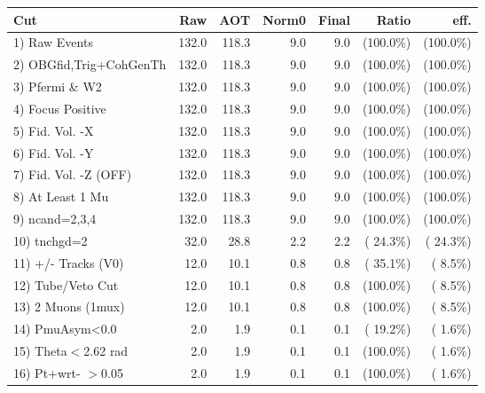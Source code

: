  \begin{table}[h!]\centering
 \begin{tabular}{||l||r|r|r|r|r|r||}
 \hline
 \hline
 Cut & Raw & AOT & Norm0 & Final & Ratio & eff.       \\
 \hline
  1) Raw Events           &        132.0 &        118.3 &          9.0 &          9.0 & (100.0\%) & (100.0\%) \\
  2) OBGfid,Trig+CohGenTh &        132.0 &        118.3 &          9.0 &          9.0 & (100.0\%) & (100.0\%) \\
  3) Pfermi \& W2         &        132.0 &        118.3 &          9.0 &          9.0 & (100.0\%) & (100.0\%) \\
  4) Focus Positive       &        132.0 &        118.3 &          9.0 &          9.0 & (100.0\%) & (100.0\%) \\
  5) Fid. Vol. -X         &        132.0 &        118.3 &          9.0 &          9.0 & (100.0\%) & (100.0\%) \\
  6) Fid. Vol. -Y         &        132.0 &        118.3 &          9.0 &          9.0 & (100.0\%) & (100.0\%) \\
  7) Fid. Vol. -Z (OFF)   &        132.0 &        118.3 &          9.0 &          9.0 & (100.0\%) & (100.0\%) \\
  8) At Least 1 Mu        &        132.0 &        118.3 &          9.0 &          9.0 & (100.0\%) & (100.0\%) \\
  9) ncand=2,3,4          &        132.0 &        118.3 &          9.0 &          9.0 & (100.0\%) & (100.0\%) \\
 10) tnchgd=2             &         32.0 &         28.8 &          2.2 &          2.2 & ( 24.3\%) & ( 24.3\%) \\
 11) +/- Tracks (V0)      &         12.0 &         10.1 &          0.8 &          0.8 & ( 35.1\%) & (  8.5\%) \\
 12) Tube/Veto Cut        &         12.0 &         10.1 &          0.8 &          0.8 & (100.0\%) & (  8.5\%) \\
 13) 2 Muons (1mux)       &         12.0 &         10.1 &          0.8 &          0.8 & (100.0\%) & (  8.5\%) \\
 14) PmuAsym<0.0          &          2.0 &          1.9 &          0.1 &          0.1 & ( 19.2\%) & (  1.6\%) \\
 15) Theta$<$2.62 rad     &          2.0 &          1.9 &          0.1 &          0.1 & (100.0\%) & (  1.6\%) \\
 16) Pt+wrt- $>$0.05      &          2.0 &          1.9 &          0.1 &          0.1 & (100.0\%) & (  1.6\%) \\

\end{tabular}
\end{table}
